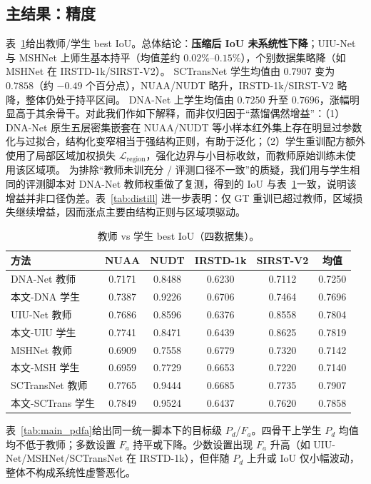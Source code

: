 \documentclass[lettersize,journal]{IEEEtran}
\begin{document}
\subsection{主结果：精度}
\label{sec:main_results}

表~\ref{tab:main_iou}给出教师/学生 best IoU。总体结论：\textbf{压缩后 IoU 未系统性下降}；UIU-Net 与 MSHNet 上师生基本持平（均值差约 $0.02\%$--$0.15\%$），个别数据集略降（如 MSHNet 在 IRSTD-1k/SIRST-V2）。
SCTransNet 学生均值由 $0.7907$ 变为 $0.7858$（约 $-0.49$ 个百分点），NUAA/NUDT 略升，IRSTD-1k/SIRST-V2 略降，整体仍处于持平区间。
DNA-Net 上学生均值由 $0.7250$ 升至 $0.7696$，涨幅明显高于其余骨干。对此我们作如下解释，而非仅归因于“蒸馏偶然增益”：（1）DNA-Net 原生五层密集嵌套在 NUAA/NUDT 等小样本红外集上存在明显过参数化与过拟合，结构化变窄相当于强结构正则，有助于泛化；（2）学生重训配方额外使用了局部区域加权损失 $\mathcal{L}_{\mathrm{region}}$，强化边界与小目标收敛，而教师原始训练未使用该区域项。
为排除“教师未训充分 / 评测口径不一致”的质疑，我们用与学生相同的评测脚本对 DNA-Net 教师权重做了复测，得到的 IoU 与表~\ref{tab:main_iou}一致，说明该增益并非口径伪差。表~\ref{tab:distill} 进一步表明：仅 GT 重训已超过教师，区域损失继续增益，因而涨点主要由结构正则与区域项驱动。

\begin{table}[!t]
\caption{教师 vs 学生 best IoU（四数据集）。}
\label{tab:main_iou}
\centering
\footnotesize
\begin{tabular}{|l|c|c|c|c|c|}
\hline
方法 & NUAA & NUDT & IRSTD-1k & SIRST-V2 & 均值 \\
\hline
DNA-Net 教师 & 0.7171 & 0.8488 & 0.6230 & 0.7112 & 0.7250 \\
本文-DNA 学生 & 0.7387 & 0.9226 & 0.6706 & 0.7464 & 0.7696 \\
\hline
UIU-Net 教师 & 0.7686 & 0.8596 & 0.6376 & 0.8558 & 0.7804 \\
本文-UIU 学生 & 0.7741 & 0.8471 & 0.6439 & 0.8625 & 0.7819 \\
\hline
MSHNet 教师 & 0.6909 & 0.7558 & 0.6779 & 0.7320 & 0.7142 \\
本文-MSH 学生 & 0.6959 & 0.7729 & 0.6653 & 0.7220 & 0.7140 \\
\hline
SCTransNet 教师 & 0.7765 & 0.9444 & 0.6685 & 0.7735 & 0.7907 \\
本文-SCTrans 学生 & 0.7849 & 0.9524 & 0.6437 & 0.7620 & 0.7858 \\
\hline
\end{tabular}
\end{table}

表~\ref{tab:main_pdfa}给出同一统一脚本下的目标级 $P_d$/$F_a$。四骨干上学生 $P_d$ 均值均不低于教师；多数设置 $F_a$ 持平或下降。少数设置出现 $F_a$ 升高（如 UIU-Net/MSHNet/SCTransNet 在 IRSTD-1k），但伴随 $P_d$ 上升或 IoU 仅小幅波动，整体不构成系统性虚警恶化。
\end{document}
